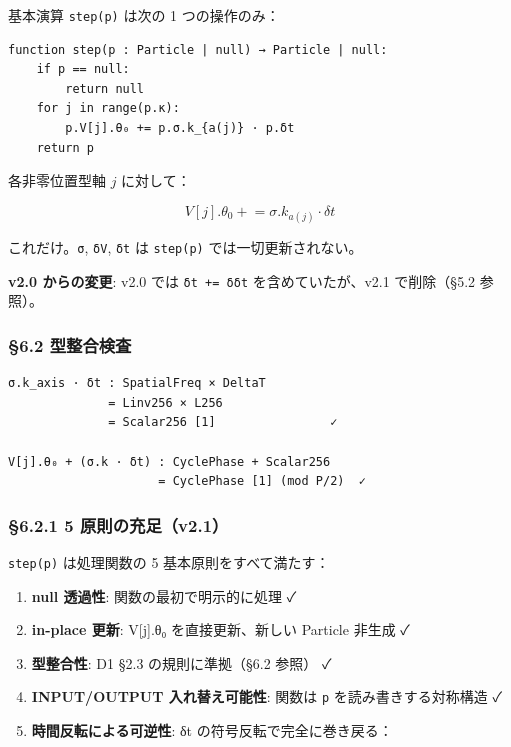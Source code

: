 \documentclass[a4paper,11pt]{ltjsarticle}
\providecommand{\tightlist}{\setlength{\itemsep}{0pt}\setlength{\parskip}{0pt}}
\begin{document}
基本演算 \texttt{step(p)} は次の 1 つの操作のみ：

\begin{verbatim}
function step(p : Particle | null) → Particle | null:
    if p == null:
        return null
    for j in range(p.κ):
        p.V[j].θ₀ += p.σ.k_{a(j)} · p.δt
    return p
\end{verbatim}

各非零位置型軸 \(j\) に対して：

\[V[j].\theta_0 \mathrel{+}= \sigma.k_{a(j)} \cdot \delta t\]

これだけ。\texttt{σ}, \texttt{δV}, \texttt{δt} は \texttt{step(p)}
では一切更新されない。

\textbf{v2.0 からの変更}: v2.0 では \texttt{δt\ +=\ δδt}
を含めていたが、v2.1 で削除（§5.2 参照）。

\subsubsection{§6.2 型整合検査}\label{ux578bux6574ux5408ux691cux67fb}

\begin{verbatim}
σ.k_axis · δt : SpatialFreq × DeltaT 
              = Linv256 × L256 
              = Scalar256 [1]                ✓

V[j].θ₀ + (σ.k · δt) : CyclePhase + Scalar256
                     = CyclePhase [1] (mod P/2)  ✓
\end{verbatim}

\subsubsection{§6.2.1 5
原則の充足（v2.1）}\label{ux539fux5247ux306eux5145ux8db3v2.1}

\texttt{step(p)} は処理関数の 5 基本原則をすべて満たす：

\begin{enumerate}
\def\labelenumi{\arabic{enumi}.}
\tightlist
\item
  \textbf{null 透過性}: 関数の最初で明示的に処理 ✓
\item
  \textbf{in-place 更新}: V{[}j{]}.θ₀ を直接更新、新しい Particle 非生成
  ✓
\item
  \textbf{型整合性}: D1 §2.3 の規則に準拠（§6.2 参照） ✓
\item
  \textbf{INPUT/OUTPUT 入れ替え可能性}: 関数は \texttt{p}
  を読み書きする対称構造 ✓
\item
  \textbf{時間反転による可逆性}: δt の符号反転で完全に巻き戻る：
\end{enumerate}
\end{document}
